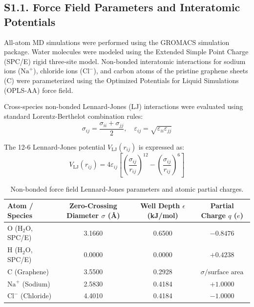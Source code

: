 \documentclass[3p,preprint,12pt,numbers,square,sort&compress]{elsarticle}
\begin{document}
\subsection{S1.1. Force Field Parameters and Interatomic Potentials}
All-atom MD simulations were performed using the GROMACS simulation package. Water molecules were modeled using the Extended Simple Point Charge (SPC/E) rigid three-site model. Non-bonded interatomic interactions for sodium ions ($\text{Na}^+$), chloride ions ($\text{Cl}^-$), and carbon atoms of the pristine graphene sheets ($\text{C}$) were parameterized using the Optimized Potentials for Liquid Simulations (OPLS-AA) force field.

Cross-species non-bonded Lennard-Jones (LJ) interactions were evaluated using standard Lorentz-Berthelot combination rules:
\begin{equation}
    \sigma_{ij} = \frac{\sigma_{ii} + \sigma_{jj}}{2}, \quad \varepsilon_{ij} = \sqrt{\varepsilon_{ii} \varepsilon_{jj}}
    \tag{S1}
\end{equation}

The 12-6 Lennard-Jones potential $V_{\text{LJ}}(r_{ij})$ is expressed as:
\begin{equation}
    V_{\text{LJ}}(r_{ij}) = 4 \varepsilon_{ij} \left[ \left(\frac{\sigma_{ij}}{r_{ij}}\right)^{12} - \left(\frac{\sigma_{ij}}{r_{ij}}\right)^6 \right]
    \tag{S2}
\end{equation}

\begin{table}[H]
\centering
\caption{Non-bonded force field Lennard-Jones parameters and atomic partial charges.}
\label{tab:ff_params}
\begin{tabular}{lccc}
\toprule
\textbf{Atom / Species} & \textbf{Zero-Crossing Diameter $\sigma$ (\AA)} & \textbf{Well Depth $\epsilon$ (kJ/mol)} & \textbf{Partial Charge $q$ ($e$)} \\
\midrule
O ($\text{H}_2\text{O}$, SPC/E) & 3.1660 & 0.6500 & $-0.8476$ \\
H ($\text{H}_2\text{O}$, SPC/E) & 0.0000 & 0.0000 & $+0.4238$ \\
C (Graphene) & 3.5500 & 0.2928 & $\sigma / \text{surface area}$ \\
$\text{Na}^+$ (Sodium) & 2.5830 & 0.4184 & $+1.0000$ \\
$\text{Cl}^-$ (Chloride) & 4.4010 & 0.4184 & $-1.0000$ \\
\bottomrule
\end{tabular}
\end{table}
\end{document}
